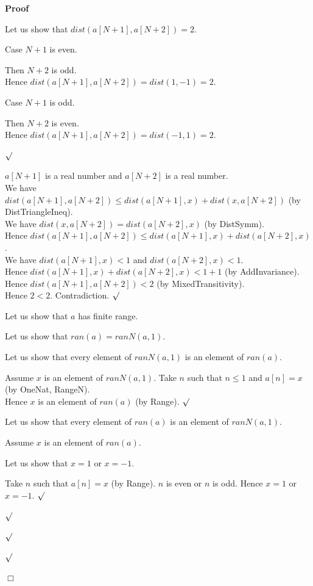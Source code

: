 \documentclass{article}
\newenvironment{forthel}{\begin{leftbar}}{\end{leftbar}}
\newenvironment{proof}{\noindent\textbf{Proof\ }}{\hspace*{\fill}$\Box$\medskip}
\newenvironment{subproof}{\begin{list}{}{}
		\item[\text{Proof}]}{\hfill $\surd$ \end{list}}
\newenvironment{case}{\begin{list}{}{}
		\item[]}{\end{list}}
\begin{document}
\begin{forthel}
\begin{proof}
\begin{subproof}
			Let us show that $dist(a[N + 1],a[N + 2]) = 2$.
			\begin{subproof}
				Case $N + 1$ is even.
				\begin{case}
					Then $N + 2$ is odd.\\
					Hence $dist(a[N + 1],a[N + 2]) = dist(1,-1) = 2$.
				\end{case}
				Case $N + 1$ is odd.				
				\begin{case}
					Then $N + 2$ is even.\\
					Hence $dist(a[N + 1],a[N + 2]) = dist(-1,1) = 2$.
				\end{case}
			\end{subproof}
			$a[N + 1]$ is a real number and $a[N + 2]$ is a real number.\\
			We have $dist(a[N + 1],a[N + 2]) \leq dist(a[N + 1],x) + dist(x,a[N + 2])$ (by DistTriangleIneq).\\
			We have $dist(x,a[N + 2]) = dist(a[N + 2],x)$ (by DistSymm).\\
			Hence $dist(a[N + 1],a[N + 2]) \leq dist(a[N + 1],x) + dist(a[N + 2],x)$.\\
			We have $dist(a[N + 1],x) < 1$ and $dist(a[N + 2],x) < 1$.\\
			Hence $dist(a[N + 1],x) + dist(a[N + 2],x) < 1 + 1$ (by AddInvariance).\\
			Hence $dist(a[N + 1],a[N + 2]) < 2$ (by MixedTransitivity).\\
			Hence $2 < 2$.
			Contradiction.
		\end{subproof}
		Let us show that $a$ has finite range.
		\begin{subproof}
			Let us show that $ran(a) = ranN(a,1)$.
			\begin{subproof}
				Let us show that every element of $ranN(a,1)$ is an element of $ran(a)$.
				\begin{subproof}
					Assume $x$ is an element of $ranN(a,1)$.
					Take $n$ such that $n \leq 1$ and $a[n] = x$ (by OneNat, RangeN).\\
					Hence $x$ is an element of $ran(a)$ (by Range).
				\end{subproof}
				Let us show that every element of $ran(a)$ is an element of $ranN(a,1)$.
				\begin{subproof}
					Assume $x$ is an element of $ran(a)$.
					
					Let us show that $x = 1$ or $x = -1$.
					\begin{subproof}
						Take $n$ such that $a[n] = x$ (by Range).
						$n$ is even or $n$ is odd.
						Hence $x = 1$ or $x = -1$.
					\end{subproof}
				

\end{subproof}
\end{subproof}
\end{subproof}
\end{proof}
\end{forthel}
\end{document}
